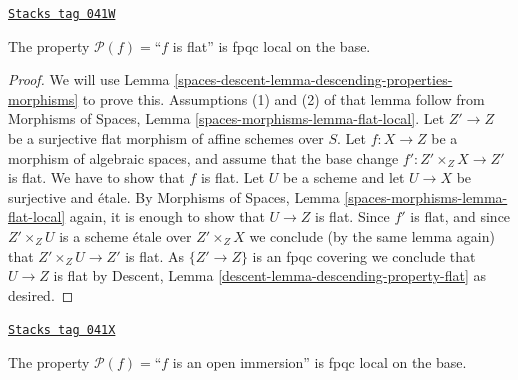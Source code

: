 \begin{lemma}
\label{spaces-descent-lemma-descending-property-flat}
\href{https://stacks.math.columbia.edu/tag/041W}{\texttt{Stacks tag 041W}}

The property $\mathcal{P}(f) =$``$f$ is flat''
is fpqc local on the base.
\end{lemma}

\begin{proof}
We will use
Lemma \ref{spaces-descent-lemma-descending-properties-morphisms}
to prove this. Assumptions (1) and (2) of that lemma follow from
Morphisms of Spaces,
Lemma \ref{spaces-morphisms-lemma-flat-local}.
Let $Z' \to Z$ be a surjective flat morphism of affine schemes over $S$.
Let $f : X \to Z$ be a morphism of algebraic spaces, and assume
that the base change $f' : Z' \times_Z X \to Z'$ is flat.
We have to show that $f$ is flat. Let $U$ be a scheme
and let $U \to X$ be surjective and \'etale. By
Morphisms of Spaces,
Lemma \ref{spaces-morphisms-lemma-flat-local}
again, it is enough to show that $U \to Z$ is flat.
Since $f'$ is flat, and since $Z' \times_Z U$ is a
scheme \'etale over $Z' \times_Z X$ we conclude (by the same lemma again) that
$Z' \times_Z U \to Z'$ is flat.
As $\{Z' \to Z\}$ is an fpqc covering we conclude that
$U \to Z$ is flat by
Descent, Lemma \ref{descent-lemma-descending-property-flat}
as desired.
\end{proof}

\begin{lemma}
\label{spaces-descent-lemma-descending-property-open-immersion}
\href{https://stacks.math.columbia.edu/tag/041X}{\texttt{Stacks tag 041X}}

The property $\mathcal{P}(f) =$``$f$ is an open immersion''
is fpqc local on the base.
\end{lemma}

